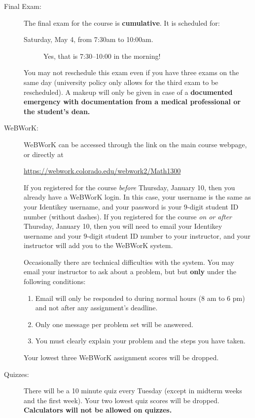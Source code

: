 \documentclass[11pt]{article}
\begin{document}
\begin{description}
\item[Final Exam:] The final exam for the course is
  \textbf{cumulative}.  It is scheduled for:

  \begin{description}
  \item[Saturday, May 4, from 7:30am to 10:00am.]
    Yes, that is 7:30--10:00 in the morning!
  \end{description}

  You may not reschedule this exam even if you have three exams on the
  same day (university policy only allows for the third exam to be
  rescheduled). A makeup will only be given in case of a
  \textbf{documented emergency with documentation from a medical
    professional or the student's dean.}

\item[WeBWorK:] WeBWorK can be accessed through the link on the main
  course webpage, or directly at

  \begin{center}
    \url{https://webwork.colorado.edu/webwork2/Math1300}
  \end{center}

  If you registered for the course \emph{before} Thursday, January 10,
  then you already have a WeBWorK login. In this case, your username
  is the same as your Identikey username, and your password is your
  $9$-digit student ID number (without dashes). If you registered for
  the course \emph{on or after} Thursday, January 10, then you will
  need to email your Identikey username and your $9$-digit student ID
  number to your instructor, and your instructor will add you to the
  WeBWorK system.

  Occasionally there are technical difficulties with the system. You
  may email your instructor to ask about a problem, but but
  \textbf{only} under the following conditions:
  \begin{enumerate}
  \item Email will only be responded to during normal hours (8 am to 6
    pm) and not after any assignment's deadline.
  \item Only one message per problem set will be answered.
  \item You must clearly explain your problem and the steps you have
    taken.
  \end{enumerate}
  Your lowest three WeBWorK assignment scores will be dropped.

\item[Quizzes:] There will be a 10 minute quiz every Tuesday (except in
  midterm weeks and the first week).  Your two lowest quiz scores will
  be dropped. \textbf{Calculators will not be allowed on quizzes.}


\end{description}
\end{document}
